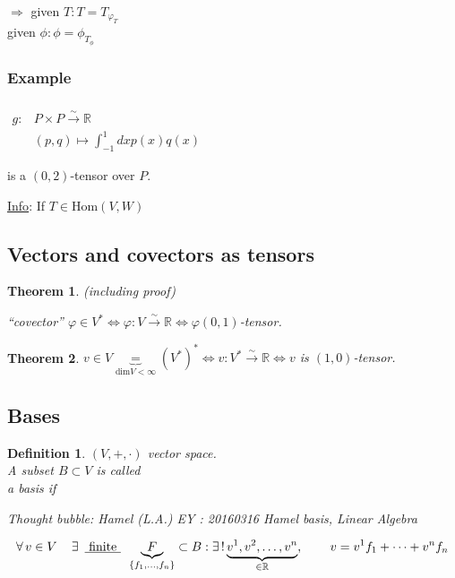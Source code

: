 \documentclass[10pt]{amsart}
\newtheorem{theorem}{Theorem}
\newtheorem{definition}{Definition}
\begin{document}
\begin{multicols*}{2}
$\Longrightarrow $ given $T: T = T_{\varphi_T}$ \\
\phantom{$\Longrightarrow$} given $\phi: \phi = \phi_{T_{\phi}}$

\subsubsection*{Example} $\begin{aligned} & \quad \\
g: & P \times P \xrightarrow{ \sim } \mathbb{R} \\
& (p,q) \mapsto \int_{-1}^1 dx p(x) q(x) \end{aligned}$

is a $(0,2)$-tensor over $P$.  

\underline{Info}: If $T \in \text{Hom}(V,W)$

\subsection{Vectors and covectors as tensors}

\begin{theorem} (including proof)
	
	``covector''  $\varphi \in V^* \Longleftrightarrow \varphi : V \xrightarrow{ \sim } \mathbb{R} \Longleftrightarrow \varphi (0,1)$-tensor.  
\end{theorem}

\begin{theorem}
	$v\in V \underbrace{=}_{\text{dim}V<\infty} (V^*)^* \Longleftrightarrow v: V^* \xrightarrow{ \sim} \mathbb{R} \Longleftrightarrow v $ is $(1,0)$-tensor.  
\end{theorem}

\subsection{Bases}

\begin{definition}
	$(V,+,\cdot)$ vector space. \\
	A subset $B\subset V$ is called \\
	a basis if 
	
	Thought bubble: Hamel (L.A.) EY : 20160316 Hamel basis, Linear Algebra
	
	\[
	\forall \, v \in V \quad \, \exists \, \text{ \underline{ finite } } \, \underbrace{F}_{ \lbrace f_1 , \dots , f_n \rbrace }  \subset B : \exists \, ! \underbrace{ v^1, v^2 , \dots , v^n }_{ \in \mathbb{R} },  \qquad \, v = v^1 f_1 + \dots + v^n f_n 
	\]
\end{definition}


\end{multicols*}
\end{document}

